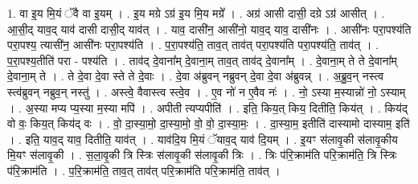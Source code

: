 \documentclass[17pt]{extarticle}
\begin{document}
1. वा इ॒य मि॒यं ॅवै वा इ॒यम् । . इ॒य मग्रे ऽग्र॑ इ॒य मि॒य मग्रे᳚ । . अग्र॑ आसी दासी॒ दग्रे ऽग्र॑ आसीत् । . आ॒सी॒द् याव॒द् याव॑ दासी दासी॒द् याव॑त् । . याव॒ दासी॑न॒ आसी॑नो॒ याव॒द् याव॒ दासी॑नः । . आसी॑नः परा॒पश्य॑ति परा॒पश्य॒ त्यासी॑न॒ आसी॑नः परा॒पश्य॑ति । . प॒रा॒पश्य॑ति॒ ताव॒त् ताव॑त् परा॒पश्य॑ति परा॒पश्य॑ति॒ ताव॑त् । . प॒रा॒पश्य॒तीति॑ परा - पश्य॑ति । . ताव॑द् दे॒वाना᳚म् दे॒वाना॒म् ताव॒त् ताव॑द् दे॒वाना᳚म् । . दे॒वाना॒म् ते ते दे॒वाना᳚म् दे॒वाना॒म् ते । . ते दे॒वा दे॒वा स्ते ते दे॒वाः । . दे॒वा अ॑ब्रुवन् नब्रुवन् दे॒वा दे॒वा अ॑ब्रुवन्न् । . अ॒ब्रु॒व॒न् नस्त्व स्त्व॑ब्रुवन् नब्रुव॒न् नस्तु॑ । . अस्त्वे॒ वैवास्त्व स्त्वे॒व । . ए॒व नो॑ न ए॒वैव नः॑ । . नो॒ ऽस्या म॒स्यान्नो॑ नो॒ ऽस्याम् । . अ॒स्या मप्य प्य॒स्या म॒स्या मपि॑ । . अपीती त्यप्यपीति॑ । . इति॒ किय॒त् किय॒ दितीति॒ किय॑त् । . किय॑द् वो वः॒ किय॒त् किय॑द् वः । . वो॒ दा॒स्या॒मो॒ दा॒स्या॒मो॒ वो॒ वो॒ दा॒स्या॒मः॒ । . दा॒स्या॒म॒ इतीति॑ दास्यामो दास्याम॒ इति॑ । . इति॒ याव॒द् याव॒ दितीति॒ याव॑त् । . याव॑दि॒य मि॒यं ॅयाव॒द् याव॑ दि॒यम् । . इ॒यꣳ स॑लावृ॒की स॑लावृ॒कीय मि॒यꣳ स॑लावृ॒की । . स॒ला॒वृ॒की त्रि स्त्रिः स॑लावृ॒की स॑लावृ॒की त्रिः । . त्रिः प॑रि॒क्राम॑ति परि॒क्राम॑ति॒ त्रि स्त्रिः प॑रि॒क्राम॑ति । . प॒रि॒क्राम॑ति॒ ताव॒त् ताव॑त् परि॒क्राम॑ति परि॒क्राम॑ति॒ ताव॑त् । \newline
\end{document}
